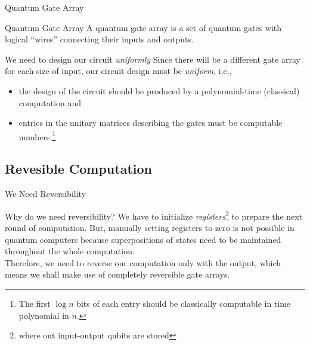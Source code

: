 \documentclass{beamer}
\renewcommand{\:}{\text{ }}
\begin{document}
    \begin{frame}{Quantum Gate Array}
        \begin{block}{Quantum Gate Array}
            A \alert{quantum gate array} is a set of quantum gates with logical ``wires'' connecting their inputs and outputs.
        \end{block}
        \begin{alertblock}{We need to design our circuit \textit{uniformly}}
            \small
            Since there will be a different gate array for each size of input, our circuit design must be \textit{uniform}, i.e.,
            \begin{itemize}
                \setlength\itemsep{-0.2em}
                \item the design of the circuit should be produced by a polynomial-time (classical) computation and
                \item entries in the unitary matrices describing the gates must be computable numbers.\footnote{The first $\log n$ bits of each entry should be classically computable in time polynomial in $n$.}
            \end{itemize}
        \end{alertblock}
    \end{frame}

    \subsection{Revesible Computation}

    \begin{frame}{We Need Reversibility}
        \begin{alertblock}{Why do we need reversibility?}
            \small
            We have to initialize \textit{registers}\footnote{where out input-output qubits are stored} to prepare the next round of computation.
            But, manually setting registers to zero is not possible in quantum computers because \alert{superpositions of states need to be maintained} throughout the whole computation.\\
            Therefore, we need to reverse our computation only with the output, which means we shall make use of completely reversible gate arrays.
        \end{alertblock}
    \end{frame}
\end{document}
